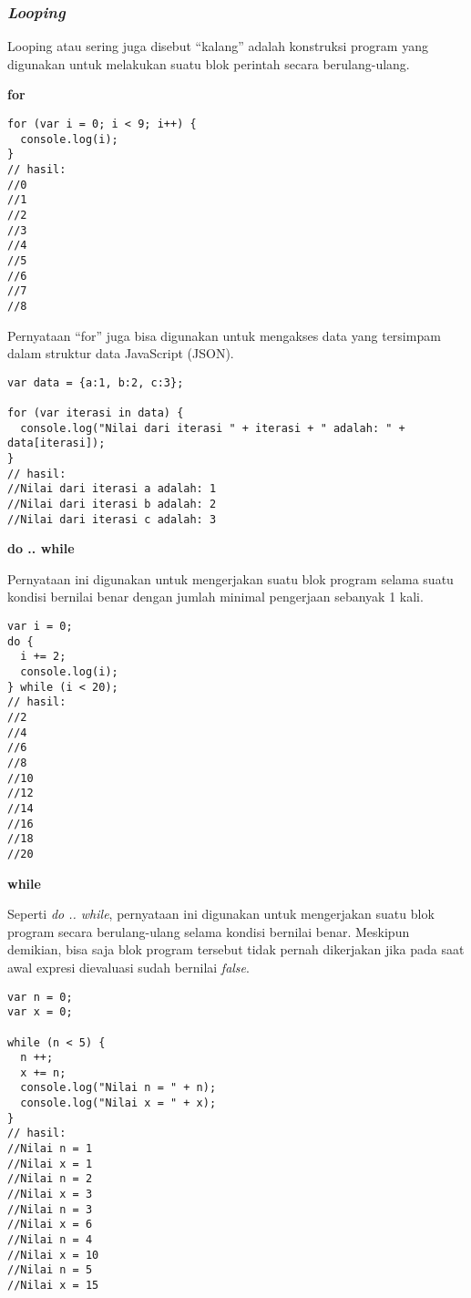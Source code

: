 \subsubsection{\textit{Looping}}

Looping atau sering juga disebut ``kalang'' adalah konstruksi program yang digunakan untuk melakukan suatu blok perintah secara berulang-ulang.

\textbf{for}

\begin{lstlisting}
for (var i = 0; i < 9; i++) {
  console.log(i);
}
// hasil:
//0
//1
//2
//3
//4
//5
//6
//7
//8
\end{lstlisting}

Pernyataan ``for'' juga bisa digunakan untuk mengakses data yang tersimpam dalam struktur data JavaScript (JSON).

\begin{lstlisting}
var data = {a:1, b:2, c:3};

for (var iterasi in data) {
  console.log("Nilai dari iterasi " + iterasi + " adalah: " + data[iterasi]);
}
// hasil:
//Nilai dari iterasi a adalah: 1
//Nilai dari iterasi b adalah: 2
//Nilai dari iterasi c adalah: 3
\end{lstlisting}

\textbf{do .. while}

Pernyataan ini digunakan untuk mengerjakan suatu blok program selama suatu kondisi bernilai benar dengan jumlah minimal pengerjaan sebanyak 1 kali.

\begin{lstlisting}
var i = 0;
do {
  i += 2;
  console.log(i);
} while (i < 20);
// hasil:
//2
//4
//6
//8
//10
//12
//14
//16
//18
//20
\end{lstlisting}

\textbf{while}

Seperti \textit{do .. while}, pernyataan ini digunakan untuk mengerjakan suatu blok program secara berulang-ulang selama kondisi bernilai benar. Meskipun demikian, bisa saja blok program tersebut tidak pernah dikerjakan jika pada saat awal expresi dievaluasi sudah bernilai \textit{false}.

\begin{lstlisting}
var n = 0;
var x = 0;

while (n < 5) {
  n ++;
  x += n;
  console.log("Nilai n = " + n);
  console.log("Nilai x = " + x);
}
// hasil:
//Nilai n = 1
//Nilai x = 1
//Nilai n = 2
//Nilai x = 3
//Nilai n = 3
//Nilai x = 6
//Nilai n = 4
//Nilai x = 10
//Nilai n = 5
//Nilai x = 15
\end{lstlisting}

